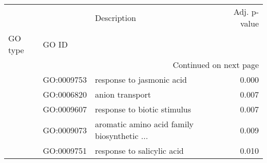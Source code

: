\begin{longtable}{lllr}
\toprule
   &            &                                  Description &  Adj. p-value \\
GO type & GO ID &                                              &               \\
\midrule
\endhead
\midrule
\multicolumn{4}{r}{{Continued on next page}} \\
\midrule
\endfoot

\bottomrule
\endlastfoot
\multirow{5}{*}{BP} & GO:0009753 &                    response to jasmonic acid &         0.000 \\
   & GO:0006820 &                              anion transport &         0.007 \\
   & GO:0009607 &                  response to biotic stimulus &         0.007 \\
   & GO:0009073 &  aromatic amino acid family biosynthetic ... &         0.009 \\
   & GO:0009751 &                   response to salicylic acid &         0.010 \\
\end{longtable}
